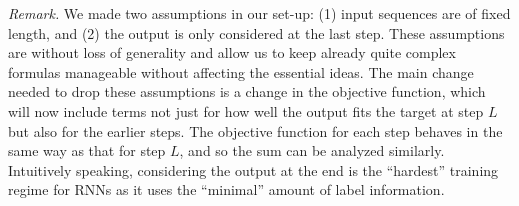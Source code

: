 \emph{Remark.} We made two assumptions in our set-up: (1) input sequences are of fixed length, and (2) the output is only considered at the last step. These assumptions are without loss of generality and allow us to keep already quite complex formulas manageable without affecting the essential ideas. The main change needed to drop these assumptions is a change in the objective function, which will now include terms not just for how well the output fits the target at step $L$ but also for the earlier steps. The objective function for each step behaves in the same way as that for step $L$, and so the sum can be analyzed similarly. Intuitively speaking, considering the output at the end is the ``hardest'' training regime for RNNs as it uses the ``minimal'' amount of label information.

